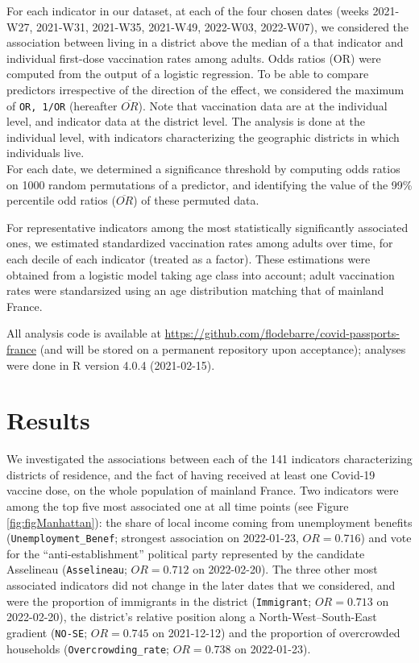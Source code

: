 \documentclass[
]{article}
\begin{document}
For each indicator in our dataset, at each of the four chosen dates (weeks 2021-W27, 2021-W31, 2021-W35, 2021-W49, 2022-W03, 2022-W07), we considered the association between living in a district above the median of a that indicator and individual first-dose vaccination rates among adults. Odds ratios (OR) were computed from the output of a logistic regression. To be able to compare predictors irrespective of the direction of the effect, we considered the maximum of \texttt{OR,\ 1/OR} (hereafter \(\overline{OR}\)). Note that vaccination data are at the individual level, and indicator data at the district level. The analysis is done at the individual level, with indicators characterizing the geographic districts in which individuals live.\\
For each date, we determined a significance threshold by computing odds ratios on 1000 random permutations of a predictor, and identifying the value of the 99\% percentile odd ratios (\(\overline{OR}\)) of these permuted data.

For representative indicators among the most statistically significantly associated ones, we estimated standardized vaccination rates among adults over time, for each decile of each indicator (treated as a factor). These estimations were obtained from a logistic model taking age class into account; adult vaccination rates were standarsized using an age distribution matching that of mainland France.

All analysis code is available at \url{https://github.com/flodebarre/covid-passports-france} (and will be stored on a permanent repository upon acceptance); analyses were done in R version 4.0.4 (2021-02-15).

\hypertarget{results}{%
\section{Results}\label{results}}

We investigated the associations between each of the 141 indicators characterizing districts of residence, and the fact of having received at least one Covid-19 vaccine dose, on the whole population of mainland France. Two indicators were among the top five most associated one at all time points (see Figure \ref{fig:figManhattan}): the share of local income coming from unemployment benefits (\texttt{Unemployment\_Benef}; strongest association on 2022-01-23, \(OR = 0.716\))
and vote for the ``anti-establishment'' political party represented by the candidate Asselineau (\texttt{Asselineau}; \(OR = 0.712\) on 2022-02-20).
The three other most associated indicators did not change in the later dates that we considered, and were the proportion of immigrants in the district (\texttt{Immigrant}; \(OR = 0.713\) on 2022-02-20),
the district's relative position along a North-West--South-East gradient (\texttt{NO-SE}; \(OR = 0.745\) on 2021-12-12)
and the proportion of overcrowded households (\texttt{Overcrowding\_rate}; \(OR = 0.738\) on 2022-01-23).
\end{document}
